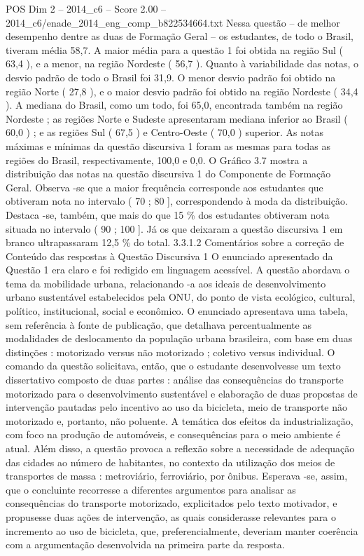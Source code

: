 \begin{textsample}{POS Dim 2 – 2014\_c6 – Score 2.00 – 2014\_c6/enade\_2014\_eng\_comp\_b822534664.txt}
Nessa questão – de melhor desempenho dentre as duas de Formação Geral – os estudantes, de todo o Brasil, tiveram média 58,7.
A maior média para a questão 1 foi obtida na região Sul ( 63,4 ), e a menor, na região Nordeste ( 56,7 ).
Quanto à variabilidade das notas, o desvio padrão de todo o Brasil foi 31,9.
O menor desvio padrão foi obtido na região Norte ( 27,8 ), e o maior desvio padrão foi obtido na região Nordeste ( 34,4 ).
A mediana do Brasil, como um todo, foi 65,0, encontrada também na região Nordeste ; as regiões Norte e Sudeste apresentaram mediana inferior ao Brasil ( 60,0 ) ; e as regiões Sul ( 67,5 ) e Centro-Oeste ( 70,0 ) superior.
As notas máximas e mínimas da questão discursiva 1 foram as mesmas para todas as regiões do Brasil, respectivamente, 100,0 e 0,0.
O Gráfico 3.7 mostra a distribuição das notas na questão discursiva 1 do Componente de Formação Geral.
Observa -se que a maior frequência corresponde aos estudantes que obtiveram nota no intervalo ( 70 ; 80 ], correspondendo à moda da distribuição.
Destaca -se, também, que mais do que 15 \% dos estudantes obtiveram nota situada no intervalo ( 90 ; 100 ].
Já os que deixaram a questão discursiva 1 em branco ultrapassaram 12,5 \% do total. 3.3.1.2 Comentários sobre a correção de Conteúdo das respostas à Questão Discursiva 1 O enunciado apresentado da Questão 1 era claro e foi redigido em linguagem acessível.
A questão abordava o tema da mobilidade urbana, relacionando -a aos ideais de desenvolvimento urbano sustentável estabelecidos pela ONU, do ponto de vista ecológico, cultural, político, institucional, social e econômico.
O enunciado apresentava uma tabela, sem referência à fonte de publicação, que detalhava percentualmente as modalidades de deslocamento da população urbana brasileira, com base em duas distinções : motorizado versus não motorizado ; coletivo versus individual.
O comando da questão solicitava, então, que o estudante desenvolvesse um texto dissertativo composto de duas partes : análise das consequências do transporte motorizado para o desenvolvimento sustentável e elaboração de duas propostas de intervenção pautadas pelo incentivo ao uso da bicicleta, meio de transporte não motorizado e, portanto, não poluente.
A temática dos efeitos da industrialização, com foco na produção de automóveis, e consequências para o meio ambiente é atual.
Além disso, a questão provoca a reflexão sobre a necessidade de adequação das cidades ao número de habitantes, no contexto da utilização dos meios de transportes de massa : metroviário, ferroviário, por ônibus.
Esperava -se, assim, que o concluinte recorresse a diferentes argumentos para analisar as consequências do transporte motorizado, explicitados pelo texto motivador, e propusesse duas ações de intervenção, as quais considerasse relevantes para o incremento ao uso de bicicleta, que, preferencialmente, deveriam manter coerência com a argumentação desenvolvida na primeira parte da resposta.

\end{textsample}
